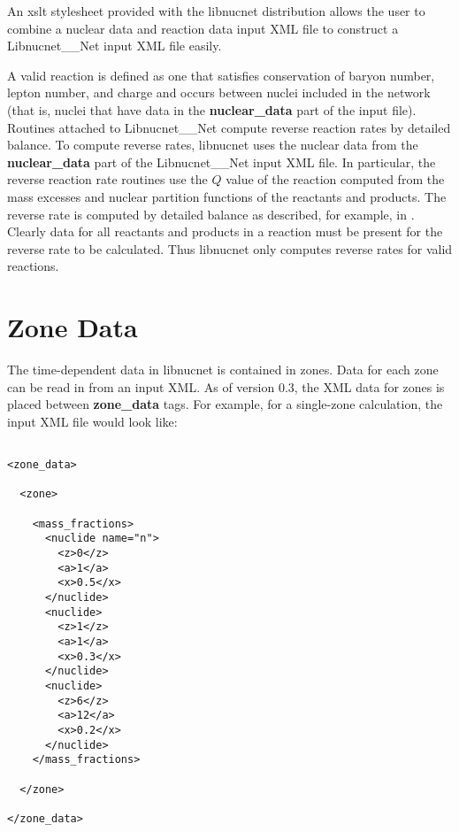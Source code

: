 \documentclass{article}    %
\begin{document}
An xslt stylesheet provided with the libnucnet distribution allows
the user to combine a nuclear data and reaction data input XML file
to construct a Libnucnet\_\_Net input XML file easily.

A valid reaction is defined as one that satisfies conservation of
baryon number, lepton number, and charge and occurs
between nuclei included in the network (that is, nuclei that
have data in the
{\bf nuclear\_data} part of the input file).  Routines attached to
Libnucnet\_\_Net compute reverse reaction rates by detailed balance.
To compute reverse rates, libnucnet uses the nuclear data  from the
{\bf nuclear\_data} part of the Libnucnet\_\_Net input XML file.  In
particular, the reverse reaction rate routines use the $Q$ value of
the reaction computed from the mass excesses and nuclear partition
functions of the reactants and products.  The reverse rate is computed
by detailed balance
as described, for example, in \cite{1967ARA&A...5..525F}.
Clearly data for all
reactants and products in a reaction must be present for the reverse
rate to be calculated.  Thus libnucnet only computes reverse rates
for valid reactions.

\section{Zone Data}

The time-dependent data in libnucnet is contained in zones.  Data for each
zone can be read in from an input XML.  As of version 0.3, the XML data for
zones is placed between {\bf zone\_data} tags.  For example,
for a single-zone calculation, the
input XML file would look like:

\begin{verbatim}

<zone_data>

  <zone>

    <mass_fractions>
      <nuclide name="n">
        <z>0</z>
        <a>1</a>
        <x>0.5</x>
      </nuclide>
      <nuclide>
        <z>1</z>
        <a>1</a>
        <x>0.3</x>
      </nuclide>
      <nuclide>
        <z>6</z>
        <a>12</a>
        <x>0.2</x>
      </nuclide>
    </mass_fractions>

  </zone>

</zone_data>

\end{verbatim}
\end{document}
